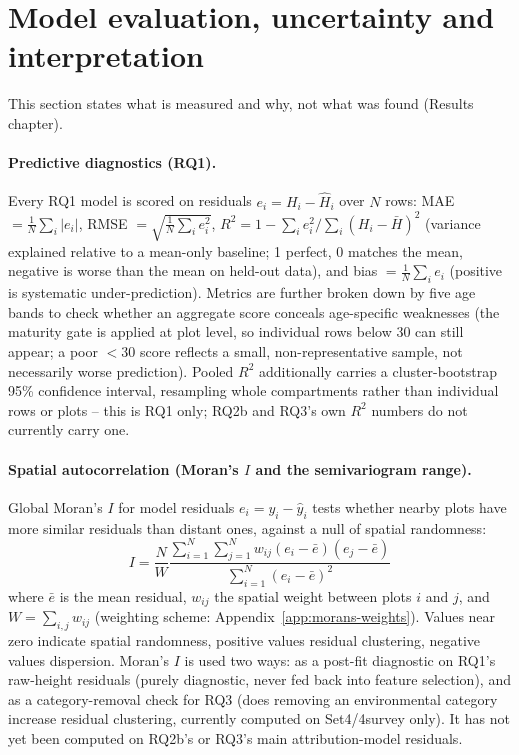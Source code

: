 {\section{Model evaluation, uncertainty and interpretation}
\label{sec:eval-diagnostics}
This section states what is measured and why, not what was found (Results chapter).

\paragraph*{Predictive diagnostics (RQ1).}
Every RQ1 model is scored on residuals $e_i = H_i - \hat H_i$ over $N$ rows: MAE $=\frac{1}{N}\sum_i|e_i|$, RMSE $=\sqrt{\frac{1}{N}\sum_i e_i^2}$, $R^2 = 1-\sum_i e_i^2/\sum_i(H_i-\bar H)^2$ (variance explained relative to a mean-only baseline; 1 perfect, 0 matches the mean, negative is worse than the mean on held-out data), and bias $=\frac{1}{N}\sum_i e_i$ (positive is systematic under-prediction). Metrics are further broken down by five age bands to check whether an aggregate score conceals age-specific weaknesses (the maturity gate is applied at plot level, so individual rows below 30 can still appear; a poor $<30$ score reflects a small, non-representative sample, not necessarily worse prediction). Pooled $R^2$ additionally carries a cluster-bootstrap 95\% confidence interval, resampling whole compartments rather than individual rows or plots -- this is RQ1 only; RQ2b and RQ3's own $R^2$ numbers do not currently carry one.

\paragraph*{Spatial autocorrelation (Moran's $I$ and the semivariogram range).}
Global Moran's $I$ for model residuals $e_i = y_i - \hat y_i$ tests whether nearby plots have more similar residuals than distant ones, against a null of spatial randomness:
\begin{equation}
    I = \frac{N}{W} \frac{\sum_{i=1}^{N} \sum_{j=1}^{N} w_{ij} (e_i - \bar{e})(e_j - \bar{e})}{\sum_{i=1}^{N} (e_i - \bar{e})^2}
    \label{eq:morans_i}
\end{equation}
where $\bar e$ is the mean residual, $w_{ij}$ the spatial weight between plots $i$ and $j$, and $W=\sum_{i,j} w_{ij}$ (weighting scheme: Appendix~\ref{app:morans-weights}). Values near zero indicate spatial randomness, positive values residual clustering, negative values dispersion. Moran's $I$ is used two ways: as a post-fit diagnostic on RQ1's raw-height residuals (purely diagnostic, never fed back into feature selection), and as a category-removal check for RQ3 (does removing an environmental category increase residual clustering, currently computed on Set4/4survey only). It has not yet been computed on RQ2b's or RQ3's main attribution-model residuals.

}
